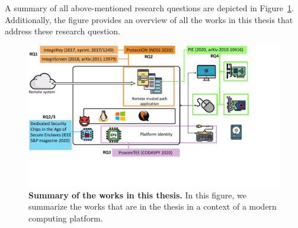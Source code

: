 A summary of all above-mentioned research questions are depicted in Figure~\ref{fig:works}. Additionally, the figure provides an overview of all the works in this thesis that address these research question.

\begin{figure}[t]
  \centering
    \includegraphics[trim={0 3cm 4cm 0},clip,width=\linewidth]{chapters/introduction/images/works.pdf}
    \caption[Summary of the works in this thesis]{\textbf{Summary of the works in this thesis.} In this figure, we summarize the works that are in the thesis in a context of a modern computing platform.}
    \label{fig:works}
\end{figure}